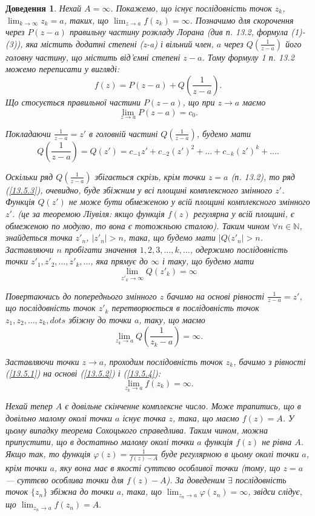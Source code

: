 \documentclass[fontsize=14pt]{scrartcl}
\theoremstyle{theorem}
\theoremstyle{proof}
\newtheorem*{dov}{Доведення}
\begin{document}
\begin{dov}
Нехай $A=\infty$. Покажемо, що існує послідовність точок $z_k$, \\ $\lim_{k\to\infty}z_k=a$, таких, що $\lim_{z\to a}f(z_k)=\infty$. Позначимо для скорочення через $P(z-a)$ правильну частину розкладу Лорана (див п. 13.2, формула (1)-(3)), яка містить додатні степені (z-a) і вільний член, $a$ через $Q(\frac{1}{z-a})$ його головну частину, що містить від'ємні степені $z-a$. Тому формулу 1 п. 13.2 можемо переписати у вигляді:
\begin{equation}\label{13.5.1}
  f(z)=P(z-a)+Q(\frac{1}{z-a}).
\end{equation}
Що стосується правильної частини $P(z-a)$, що при $z\to a$ маємо
\begin{equation}\label{13.5.2}
  \lim_{z\to a}P(z-a)=c_0.
\end{equation}

Покладаючи $\frac{1}{z-a}=z'$ в головній частині $Q(\frac{1}{z-a})$, будемо мати
\begin{equation}\label{13.5.3}
  Q(\frac{1}{z-a})=Q(z')=c_{-1}z'+c_{-2}(z')^2+\dots+c_{-k}(z')^k+\dots.
\end{equation}

Оскільки ряд $Q(\frac{1}{z-a})$ збігається скрізь, крім точки $z=a$ (п. 13.2), то ряд (\ref{13.5.3}), очевидно, буде збіжним у всі площині комплексного змінного $z'$. Функція $Q(z')$ не може бути обмеженою у всій площині комплексного змінного $z'$. (це за теоремою Ліувіля: якщо функція $f(z)$ регулярна у всій площині, є обмеженою по модулю, то вона є тотожньою сталою). Таким чином $\forall n \in \mathbb{N}$, знайдеться точка $z'_n$, $|z'_n|>n$, така, що будемо мати $|Q(z'_n|>n$. Заставляючи $n$ пробігати значення $1,2,3,\dots,k,\dots$, одержимо послідовність точки $z'_1,z'_2,\dots,z'_k,\dots$, яка прямує до $\infty$ і таку, що будемо мати
$$\lim_{z'_k\to\infty}Q(z'_k)=\infty$$

Повертаючись до попереднього змінного $z$ бачимо на основі рівності $\frac{1}{z-a}=z'$, що послідовність точок $z'_k$ перетворюється в послідовність точок $z_1, z_2, \dots, z_k, dots$ збіжну до точки $a$, таку, що маємо
\begin{equation}\label{13.5.4}
  \lim_{z_k\to a}Q(\frac{1}{z_k-a})=\infty.
\end{equation}

Заставляючи точки $z\to a$, проходим послідовність точок $z_k$, бачимо з рівності (\ref{13.5.1}) на основі (\ref{13.5.2}) і (\ref{13.5.4}):
$$\lim_{z_k\to a}f(z_k)=\infty.$$

Нехай тепер $A$ є довільне скінченне комплексне число. Може трапитись, що в довільно малому околі точки $a$ існує точка $z$, така, що маємо $f(z)=A$. У цьому випадку теорема Сохоцького справедлива. Таким чином, можна припустити, що в достатньо малому околі точки $a$ функція $f(z)$ не рівна $A$. Якщо так, то функція $\varphi(z)=\frac{1}{f(z)-A}$ буде регулярною в цьому околі точки $a$, крім точки $a$, яку вона має в якості суттєво особливої точки (тому, що $z=a$ --- суттєво особлива точки для $f(z)-A$). За доведеним $\exists$ послідовність точок $\{z_n\}$ збіжна до точки $a$, така, що $\lim_{z_n \to a}\varphi(z_n)=\infty$, звідси слідує, що $\lim_{z_n\to a}f(z_n)=A.$
\end{dov}
\end{document}
